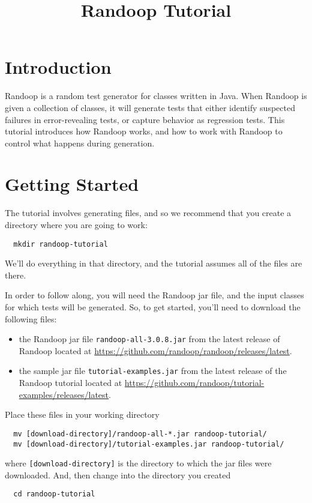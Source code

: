 \documentclass[11pt, oneside]{article} %
\title{Randoop Tutorial}
\begin{document}
\maketitle

\section{Introduction}
Randoop is a random test generator for classes written in Java.
When Randoop is given a collection of classes, it will generate tests that either identify suspected failures in error-revealing tests, or capture behavior as regression tests.
This tutorial introduces how Randoop works, and how to work with Randoop to control what happens during generation.

\section{Getting Started}
The tutorial involves generating files, and so we recommend that you create a directory where you are going to work:
\begin{verbatim}
  mkdir randoop-tutorial
\end{verbatim}
We'll do everything in that directory, and the tutorial assumes all of the files are there.

In order to follow along, you will need the Randoop jar file, and the input classes for which tests will be generated.
So, to get started, you'll need to download the following files:
\begin{itemize}
\item the Randoop jar file \texttt{randoop-all-3.0.8.jar} from the latest release of Randoop located at \url{https://github.com/randoop/randoop/releases/latest}.
\item the sample jar file \texttt{tutorial-examples.jar} from the latest release of the Randoop tutorial located at \url{https://github.com/randoop/tutorial-examples/releases/latest}.
\end{itemize}
Place these files in your working directory
\begin{verbatim}
  mv [download-directory]/randoop-all-*.jar randoop-tutorial/
  mv [download-directory]/tutorial-examples.jar randoop-tutorial/
\end{verbatim}
where \texttt{[download-directory]} is the directory to which the jar files were downloaded.
And, then change into the directory you created
\begin{verbatim}
  cd randoop-tutorial
\end{verbatim}
\end{document}
